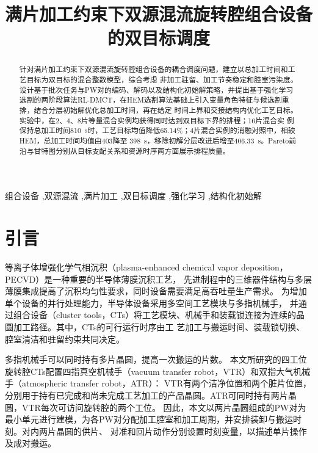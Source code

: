 \documentclass[preprint,12pt,nonatbib]{elsarticle}
\begin{document}
\raggedbottom
\begin{frontmatter}
\title{满片加工约束下双源混流旋转腔组合设备的双目标调度}
\begin{abstract}
针对满片加工约束下双源混流旋转腔组合设备的耦合调度问题，建立以总加工时间和工艺目标为双目标的混合整数模型，综合考虑
非加工驻留、加工节奏稳定和腔室污染度。设计基于批次任务与PW对的编码、解码以及结构化初始解策略，并提出基于强化学习
选割的两阶段算法RL-DMCT，在HEM选割算法基础上引入变量角色特征与候选割重排，结合分层初始解优化总加工时间，再在给定
时间上界和交接结构内优化工艺目标。实验中，在2、4、8片等量混合实例均获得同时达到双目标下界的排程；16片混合实
例保持总加工时间810~s时，工艺目标均值降低65.14\%；4片混合实例的消融对照中，相较HEM，总加工时间均值由403降至
398~s，移除初解分层改进后增至406.33~s。Pareto前沿与甘特图分别从目标支配关系和资源时序两方面展示排程质量。
\end{abstract}

\begin{keyword}
组合设备 \sep 双源混流 \sep 满片加工 \sep 双目标调度 \sep 强化学习 \sep 结构化初始解
\end{keyword}

\end{frontmatter}
\modulolinenumbers[5]
\linenumbers
\section{引言}

等离子体增强化学气相沉积（plasma-enhanced chemical vapor deposition，PECVD）是一种重要的半导体薄膜沉积工艺，
先进制程中的三维器件结构与多层薄膜集成提高了沉积均匀性要求，同时设备需要满足高吞吐量生产需求\citep{xia2016pecvd,kim2023onstack}。
为增加单个设备的并行处理能力，半导体设备采用多空间工艺模块与多指机械手，
并通过组合设备（cluster tools，CTs）将工艺模块、机械手和装载锁连接为连续的晶圆加工路径。其中，CTs的可行运行时序由工
艺加工与搬运时间、装载锁切换、腔室清洁和驻留约束共同决定\citep{pan2018survey}。

多指机械手可以同时持有多片晶圆，提高一次搬运的片数\citep{gu2024applied,gu2024multifinger}。
本文所研究的四工位旋转腔CTs配置四指真空机械手（vacuum transfer robot，VTR）和双指大气机械手（atmospheric transfer robot，ATR）：
VTR有两个洁净位置和两个脏片位置，分别用于持有已完成和尚未完成工艺加工的产品晶圆。ATR可同时持有两片晶圆，VTR每次可访问旋转腔的两个工位。
因此，本文以两片晶圆组成的PW对为最小单元进行建模，为各PW对分配加工腔室和加工周期，并安排装卸与搬运时刻。对内两片晶圆的供片、
对准和回片动作分别设置时刻变量，以描述单片操作及成对搬运。
\end{document}
